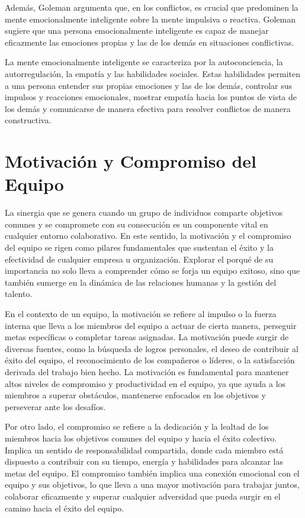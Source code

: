 \documentclass[journal]{IEEEtran}
\begin{document}
Además, Goleman argumenta que, en los conflictos, es crucial que predominen la mente emocionalmente inteligente sobre la mente impulsiva o reactiva. Goleman sugiere que una persona emocionalmente inteligente es capaz de manejar eficazmente las emociones propias y las de los demás en situaciones conflictivas.

La mente emocionalmente inteligente se caracteriza por la autoconciencia, la autorregulación, la empatía y las habilidades sociales. Estas habilidades permiten a una persona entender sus propias emociones y las de los demás, controlar sus impulsos y reacciones emocionales, mostrar empatía hacia los puntos de vista de los demás y comunicarse de manera efectiva para resolver conflictos de manera constructiva.

\section{Motivación y Compromiso del Equipo}
La sinergia que se genera cuando un grupo de individuos comparte objetivos comunes y se compromete con su consecución es un componente vital en cualquier entorno colaborativo. En este sentido, la motivación y el compromiso del equipo se rigen como pilares fundamentales que sustentan el éxito y la efectividad de cualquier empresa u organización. Explorar el porqué de su importancia no solo lleva a comprender cómo se forja un equipo exitoso, sino que también sumerge en la dinámica de las relaciones humanas y la gestión del talento.

En el contexto de un equipo, la motivación se refiere al impulso o la fuerza interna que lleva a los miembros del equipo a actuar de cierta manera, perseguir metas específicas o completar tareas asignadas. La motivación puede surgir de diversas fuentes, como la búsqueda de logros personales, el deseo de contribuir al éxito del equipo, el reconocimiento de los compañeros o líderes, o la satisfacción derivada del trabajo bien hecho. La motivación es fundamental para mantener altos niveles de compromiso y productividad en el equipo, ya que ayuda a los miembros a superar obstáculos, mantenerse enfocados en los objetivos y perseverar ante los desafíos.

Por otro lado, el compromiso se refiere a la dedicación y la lealtad de los miembros hacia los objetivos comunes del equipo y hacia el éxito colectivo. Implica un sentido de responsabilidad compartida, donde cada miembro está dispuesto a contribuir con su tiempo, energía y habilidades para alcanzar las metas del equipo. El compromiso también implica una conexión emocional con el equipo y sus objetivos, lo que lleva a una mayor motivación para trabajar juntos, colaborar eficazmente y superar cualquier adversidad que pueda surgir en el camino hacia el éxito del equipo. 
\end{document}
